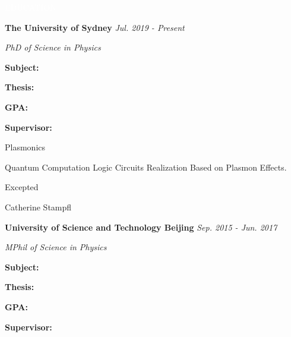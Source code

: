 \documentclass[12pt,a4paper,utf8]{report}
\begin{document}
\begin{minipage}[t]{16cm}
    \begin{snugshade}{\textcolor{white}{\textsf{\quad 
            EDUCATION\
    \qquad}}}\end{snugshade}
\end{minipage}\par
\vspace{0.2cm}\hspace{0.5cm}
\begin{minipage}[t]{15.0cm}
    {{\textbf{The University of Sydney}}}\hfill
    {\em{Jul. 2019 - Present}}\par\vspace{0.1cm}
    {\qquad\em{PhD of Science in Physics}}\par
\end{minipage}\par
\vspace{0.1cm}
    \begin{minipage}[t]{4cm}
        \qquad \textbf{Subject:}\par
        \qquad \textbf{Thesis:}\par
        \qquad \par
        \qquad \textbf{GPA:}\par
        \qquad \textbf{Supervisor:}\par
    \end{minipage}
    \begin{minipage}[t]{11cm}
        Plasmonics\par
        Quantum Computation Logic Circuits Realization Based on Plasmon Effects.\par
        Excepted\par
        Catherine Stampfl\par
    \end{minipage}\par
\vspace{0.2cm}\hspace{0.5cm}
\begin{minipage}[t]{15.0cm}
    {{\textbf{University of Science and Technology Beijing}}}\hfill
    {\em{Sep. 2015 - Jun. 2017}}\par\vspace{0.1cm}
    {\qquad\em{MPhil of Science in Physics}}\par
\end{minipage}\par
\vspace{0.1cm}
    \begin{minipage}[t]{4cm}
        \qquad \textbf{Subject:}\par
        \qquad \textbf{Thesis:}\par
        \qquad \par
        \qquad \textbf{GPA:}\par
        \qquad \textbf{Supervisor:}\par
    \end{minipage}
\end{document}
